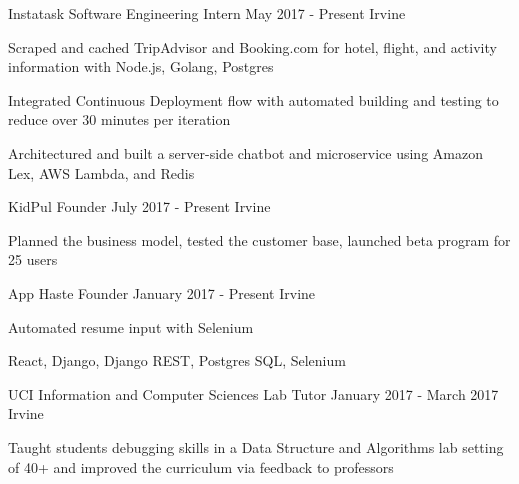 

\begin{cventries}
	
	\cventry
	{Instatask} %
	{Software Engineering Intern} %
	{May 2017 - Present} %
	{Irvine} %
	{
		\begin{cvitems}
			\item Scraped and cached TripAdvisor and Booking.com for hotel, flight, and activity information with Node.js, Golang, Postgres
			\item Integrated Continuous Deployment flow with automated building and testing to reduce over 30 minutes per iteration
			\item Architectured and built a server-side chatbot and microservice using Amazon Lex, AWS Lambda, and Redis
		\end{cvitems}
	}
	
	\cventry
	{KidPul} %
	{Founder} %
	{July 2017 - Present} %
	{Irvine} %
	{
		\begin{cvitems}
			\item Planned the business model, tested the customer base, launched beta program for 25 users
		\end{cvitems}
	}
	
	\cventry
		{App Haste} %
		{Founder} %
		{January 2017 - Present} %
		{Irvine} %
		{
			\begin{cvitems}
				\item Automated resume input with Selenium
				\item React, Django, Django REST, Postgres SQL, Selenium
			\end{cvitems}
		}

  \cventry
    {UCI Information and Computer Sciences} %
    {Lab Tutor} %
    {January 2017 - March 2017} %
    {Irvine} %
    {
      \begin{cvitems}
      	\item Taught students debugging skills in a Data Structure and Algorithms lab setting of 40+ and improved the curriculum via feedback to professors
      \end{cvitems}
    }


\end{cventries}

